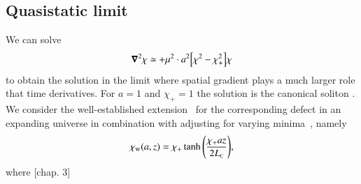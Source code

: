 
\subsection{Quasistatic limit}\label{sec:PT:symm_dws:quasistatic}
    We can solve
    \begin{equation}\label{eq:PT:symm_dws:eom_chi_quasistatic}
        \boldsymbol{\nabla}^2 \chi \simeq  +\mu^2 
         \cdot a^2{\left[  \chi^2 - \chi_+^2  \right]}\chi
    \end{equation}
    to obtain the solution in the limit where spatial gradient plays a much larger role that time derivatives. For $a=1$ and $\chi_+=1$ the solution is the canonical soliton . 
    We consider the well-established extension~\citep[see e.g.][]{pressDynamicalEvolutionDomain1989} for the corresponding defect in an expanding universe in combination with adjusting for varying minima~\citep{llinaresDomainWallsCoupled2014}, namely
    \begin{equation}\label{eq:PT:symm_dws:chi_w_quasistatic_FLRW} 
        \chi_\mathrm{w}(a, z) = \chi_+ \tanh{{\left(  \frac{ \chi_+ az}{2L_{\text{\tiny{C}}}}   \right)}},
    \end{equation}
    where [chap. 3] %

    


